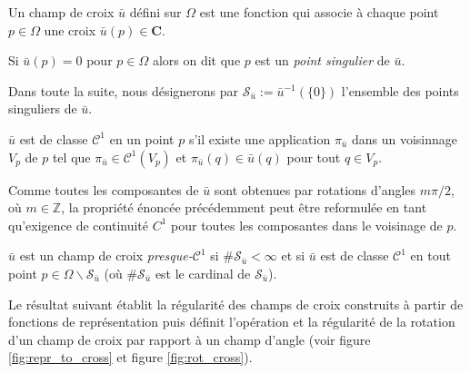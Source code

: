 Un champ de croix $\bar{u}$ défini sur $\Omega$ est une fonction qui associe à chaque point $p\in\Omega$ une croix $\bar{u}(p)\in\mathbf{C}$.

\begin{definition}
    Si $\bar{u}(p)=0$ pour $p\in\Omega$ alors on dit que $p$ est un \emph{point singulier} de $\bar{u}$.
\end{definition}

Dans toute la suite, nous désignerons par  $\mathcal{S}_{\bar{u}}:={\bar{u}}^{-1}(\{0\})$ l'ensemble des points singuliers de $\bar{u}$.

\begin{definition}%
\label{def:cont}
$\bar{u}$ est de classe $\mathcal{C}^1$ en un point $p$ s'il existe une application $\pi_{\bar{u}}$ dans un voisinnage $V_p$ de $p$ tel que $\pi_{\bar{u}}\in\mathcal{C}^1(V_p)$ et $\pi_{\bar{u}}(q)\in\bar{u}(q)$ pour tout $q\in V_p$.
\end{definition}

Comme toutes les composantes de $\bar{u}$ sont obtenues par rotations d'angles $m\pi/2$, où $m\in\mathbb{Z}$, la propriété énoncée précédemment peut être reformulée en tant qu'exigence de continuité $C^1$ pour toutes les composantes dans le voisinage de $p$.

\begin{definition}
    $\bar{u}$ est un champ de croix \emph{presque-$\mathcal{C}^1$} si $\#\mathcal{S}_{\bar{u}}<\infty$ et si $\bar{u}$ est de classe $\mathcal{C}^1$ en tout point $p\in\Omega\backslash\mathcal{S}_{\bar{u}}$ (où $\#\mathcal{S}_{\bar{u}}$ est le cardinal de $\mathcal{S}_{\bar{u}}$).
\end{definition}


Le résultat suivant établit la régularité des champs de croix construits à partir de fonctions de représentation \cite{kowalski2013pde, viertel2019approach} puis définit l'opération et la régularité de la rotation d'un champ de croix par rapport à un champ d'angle (voir figure \ref{fig:repr_to_cross} et figure \ref{fig:rot_cross}).

